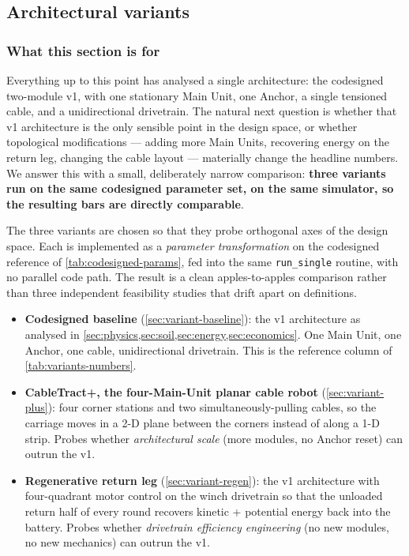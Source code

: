 \documentclass[11pt,a4paper]{article}
\begin{document}
\subsection{Architectural variants}\label{sec:ml}

\subsubsection{What this section is for}\label{sec:variants-intro}

Everything up to this point has analysed a single architecture: the codesigned two-module v1, with one stationary Main Unit, one Anchor, a single tensioned cable, and a unidirectional drivetrain. The natural next question is whether that v1 architecture is the only sensible point in the design space, or whether topological modifications --- adding more Main Units, recovering energy on the return leg, changing the cable layout --- materially change the headline numbers. We answer this with a small, deliberately narrow comparison: \textbf{three variants run on the same codesigned parameter set, on the same simulator, so the resulting bars are directly comparable}.

The three variants are chosen so that they probe orthogonal axes of the design space. Each is implemented as a \emph{parameter transformation} on the codesigned reference of \cref{tab:codesigned-params}, fed into the same \texttt{run\_single} routine, with no parallel code path. The result is a clean apples-to-apples comparison rather than three independent feasibility studies that drift apart on definitions.

\begin{itemize}[leftmargin=1.6em,itemsep=0.15em]
    \item \textbf{Codesigned baseline} (\cref{sec:variant-baseline}): the v1 architecture as analysed in \cref{sec:physics,sec:soil,sec:energy,sec:economics}. One Main Unit, one Anchor, one cable, unidirectional drivetrain. This is the reference column of \cref{tab:variants-numbers}.
    \item \textbf{CableTract+, the four-Main-Unit planar cable robot} (\cref{sec:variant-plus}): four corner stations and two simultaneously-pulling cables, so the carriage moves in a 2-D plane between the corners instead of along a 1-D strip. Probes whether \emph{architectural scale} (more modules, no Anchor reset) can outrun the v1.
    \item \textbf{Regenerative return leg} (\cref{sec:variant-regen}): the v1 architecture with four-quadrant motor control on the winch drivetrain so that the unloaded return half of every round recovers kinetic + potential energy back into the battery. Probes whether \emph{drivetrain efficiency engineering} (no new modules, no new mechanics) can outrun the v1.
\end{itemize}
\end{document}
